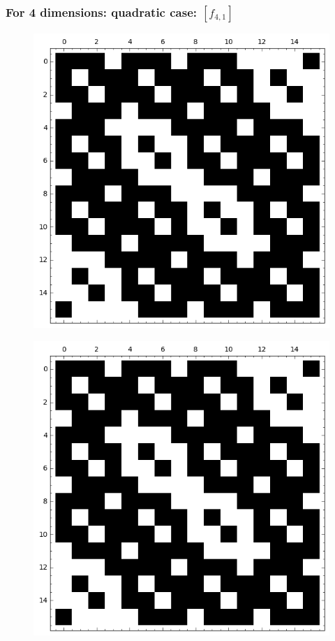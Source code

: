 \documentclass[pdf,sprung,slideColor,nocolorBG]{beamer}
\newenvironment{colortheme}[1]{
\def\ProvidesPackageRCS $##1${\relax}
\renewcommand{\ProcessOptions}{\relax}
\makeatletter

\makeatother
}{}
\begin{document}
\begin{colortheme}{jubata}
\begin{frame}
\begin{figure}
\begin{minipage}{.48\textwidth}
  \label{fig:q2_1_bent_cayley_graph_index_matrix}
\end{minipage}
\end{figure}
\end{frame}
\begin{frame}
\frametitle{For 4 dimensions: quadratic case: $[f_{4,1}]$}
\begin{figure}
\centering
\begin{minipage}{.48\textwidth}
  \centering
  \includegraphics[width=.9\linewidth]{../matrix_plot/c4_1_weight_class_matrix.png}
  \label{fig:q4_1_weight_class_matrix}
\end{minipage}%
\begin{minipage}{.48\textwidth}
  \centering
  \includegraphics[width=.9\linewidth]{../matrix_plot/c4_1_bent_cayley_graph_index_matrix.png}

\end{minipage}
\end{figure}
\end{frame}
\end{colortheme}
\end{document}
